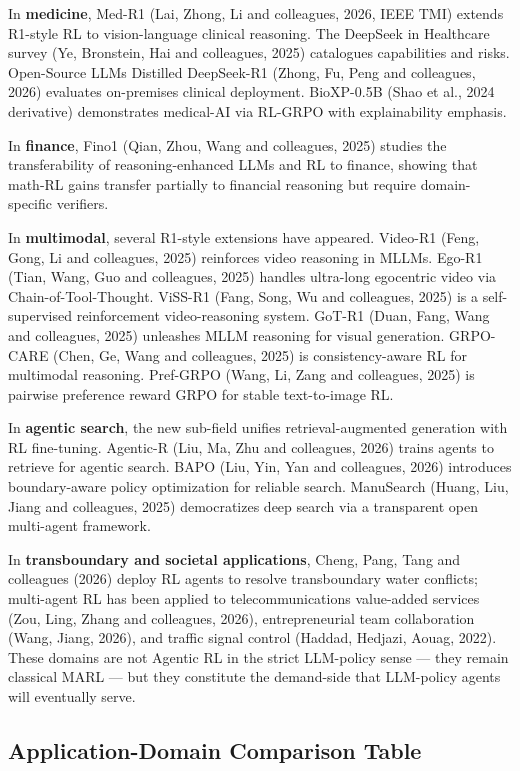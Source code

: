 In \textbf{medicine}, Med-R1 (Lai, Zhong, Li and colleagues, 2026, IEEE TMI) extends R1-style RL to vision-language clinical reasoning. The DeepSeek in Healthcare survey (Ye, Bronstein, Hai and colleagues, 2025) catalogues capabilities and risks. Open-Source LLMs Distilled DeepSeek-R1 (Zhong, Fu, Peng and colleagues, 2026) evaluates on-premises clinical deployment. BioXP-0.5B (Shao et al., 2024 derivative) demonstrates medical-AI via RL-GRPO with explainability emphasis.

In \textbf{finance}, Fino1 (Qian, Zhou, Wang and colleagues, 2025) studies the transferability of reasoning-enhanced LLMs and RL to finance, showing that math-RL gains transfer partially to financial reasoning but require domain-specific verifiers.

In \textbf{multimodal}, several R1-style extensions have appeared. Video-R1 (Feng, Gong, Li and colleagues, 2025) reinforces video reasoning in MLLMs. Ego-R1 (Tian, Wang, Guo and colleagues, 2025) handles ultra-long egocentric video via Chain-of-Tool-Thought. ViSS-R1 (Fang, Song, Wu and colleagues, 2025) is a self-supervised reinforcement video-reasoning system. GoT-R1 (Duan, Fang, Wang and colleagues, 2025) unleashes MLLM reasoning for visual generation. GRPO-CARE (Chen, Ge, Wang and colleagues, 2025) is consistency-aware RL for multimodal reasoning. Pref-GRPO (Wang, Li, Zang and colleagues, 2025) is pairwise preference reward GRPO for stable text-to-image RL.

In \textbf{agentic search}, the new sub-field unifies retrieval-augmented generation with RL fine-tuning. Agentic-R (Liu, Ma, Zhu and colleagues, 2026) trains agents to retrieve for agentic search. BAPO (Liu, Yin, Yan and colleagues, 2026) introduces boundary-aware policy optimization for reliable search. ManuSearch (Huang, Liu, Jiang and colleagues, 2025) democratizes deep search via a transparent open multi-agent framework.

In \textbf{transboundary and societal applications}, Cheng, Pang, Tang and colleagues (2026) deploy RL agents to resolve transboundary water conflicts; multi-agent RL has been applied to telecommunications value-added services (Zou, Ling, Zhang and colleagues, 2026), entrepreneurial team collaboration (Wang, Jiang, 2026), and traffic signal control (Haddad, Hedjazi, Aouag, 2022). These domains are not Agentic RL in the strict LLM-policy sense --- they remain classical MARL --- but they constitute the demand-side that LLM-policy agents will eventually serve.

\subsection{Application-Domain Comparison Table}\label{application-domain-comparison-table}

